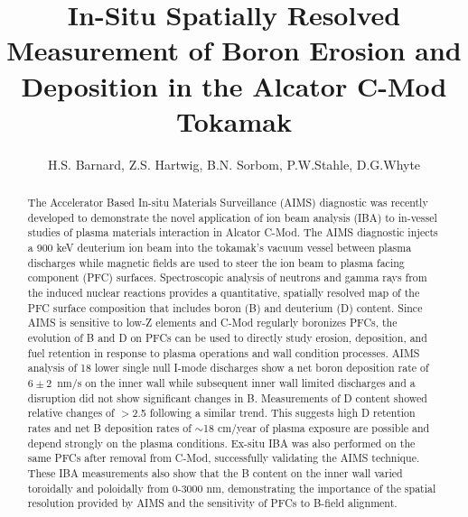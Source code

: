 \documentclass[final,3p,times,twocolumn]{elsarticle}
\begin{document}
\begin{frontmatter}

\title{In-Situ Spatially Resolved Measurement of Boron Erosion and Deposition in the Alcator C-Mod Tokamak}

\author{H.S. Barnard, Z.S. Hartwig, B.N. Sorbom, P.W.Stahle, D.G.Whyte}


\begin{abstract}

The Accelerator Based In-situ Materials Surveillance (AIMS) diagnostic was recently developed to demonstrate the novel application of ion beam analysis (IBA) to in-vessel studies of plasma materials interaction in Alcator C-Mod. The AIMS diagnostic injects a 900 keV deuterium ion beam into the tokamak's vacuum vessel between plasma discharges while magnetic fields are used to steer the ion beam to plasma facing component (PFC) surfaces. Spectroscopic analysis of neutrons and gamma rays from the induced nuclear reactions provides a quantitative, spatially resolved map of the PFC surface composition that includes boron (B) and deuterium (D) content. Since AIMS is sensitive to low-Z elements and C-Mod regularly boronizes PFCs, the evolution of B and D on PFCs can be used to directly study erosion, deposition, and fuel retention in response to plasma operations and wall condition processes. AIMS analysis of 18 lower single null I-mode discharges show a net boron deposition rate of $6\pm2$~nm/s on the inner wall while subsequent inner wall limited discharges and a disruption did not show significant changes in B. Measurements of D content showed relative changes of $>$2.5 following a similar trend. This suggests high D retention rates and net B deposition rates of $\sim$18 cm/year of plasma exposure are possible and depend strongly on the plasma conditions. Ex-situ IBA was also performed on the same PFCs after removal from C-Mod, successfully validating the AIMS technique. These IBA measurements also show that the B content on the inner wall varied toroidally and poloidally from 0-3000 nm, demonstrating the importance of the spatial resolution provided by AIMS and the sensitivity of PFCs to B-field alignment.
\end{abstract}


\end{frontmatter}
\end{document}
